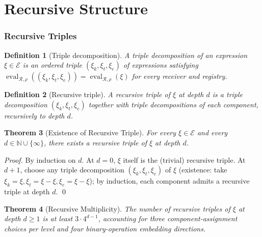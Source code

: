 \documentclass[twocolumn,a4paper]{article}
\newtheorem{theorem}{Theorem}[section]
\newtheorem{definition}[theorem]{Definition}
\DeclareMathOperator{\eval}{eval}
\newcommand{\Natural}{\mathbb{N}}
\newcommand{\Expr}{\mathcal{E}}
\newcommand{\receiver}{\mathcal{R}}
\begin{document}
\part{Recursive Structure}

\section{Recursive Triples}
\label{sec:recursive-triples}

\begin{definition}[Triple decomposition]
\label{def:triple-decomp}
A \emph{triple decomposition} of an expression $\xi\in\Expr$ is an ordered triple $(\xi_{k},\xi_{t},\xi_{e})$ of expressions satisfying $\eval_{\receiver,\rho}((\xi_{k},\xi_{t},\xi_{e}))=\eval_{\receiver,\rho}(\xi)$ for every receiver and registry.
\end{definition}

\begin{definition}[Recursive triple]
\label{def:rec-triple}
A \emph{recursive triple} of $\xi$ at depth $d$ is a triple decomposition $(\xi_{k},\xi_{t},\xi_{e})$ together with triple decompositions of each component, recursively to depth $d$.
\end{definition}

\begin{theorem}[Existence of Recursive Triple]
\label{thm:rec-existence}
For every $\xi\in\Expr$ and every $d\in\Natural\cup\{\infty\}$, there exists a recursive triple of $\xi$ at depth $d$.
\end{theorem}

\begin{proof}
By induction on $d$. At $d=0$, $\xi$ itself is the (trivial) recursive triple. At $d+1$, choose any triple decomposition $(\xi_{k},\xi_{t},\xi_{e})$ of $\xi$ (existence: take $\xi_{k}=\xi,\xi_{t}=\xi-\xi,\xi_{e}=\xi-\xi$); by induction, each component admits a recursive triple at depth $d$. \qed
\end{proof}

\begin{theorem}[Recursive Multiplicity]
\label{thm:rec-multiplicity}
The number of recursive triples of $\xi$ at depth $d\geq 1$ is at least $3\cdot 4^{d-1}$, accounting for three component-assignment choices per level and four binary-operation embedding directions.
\end{theorem}
\end{document}
